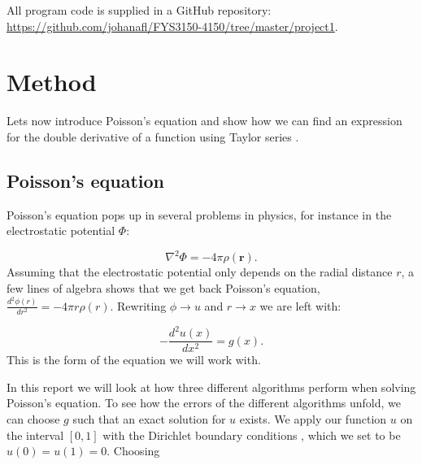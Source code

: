 \documentclass{emulateapj}
\begin{document}
    All program code is supplied in a GitHub repository: \url{https://github.com/johanafl/FYS3150-4150/tree/master/project1}.

\section{Method}
    Lets now introduce Poisson's equation and show how we can find an expression for the double derivative of a function using Taylor series \cite[Chapter 11]{kalkulus}.
    \subsection{Poisson's equation}
        Poisson's equation \cite[Chapter 13]{matmet} pops up in several problems in physics, for instance in the electrostatic potential \(\Phi\):
        
        \begin{equation*}
            \nabla^2\Phi = -4\pi\rho(\mathbf{r}).
        \end{equation*}
        Assuming that the electrostatic potential only depends on the radial distance \(r\), a few lines of algebra shows that we get back Poisson's equation, \(\frac{d^{2}\phi(r)}{dr^{2}}=-4\pi r\rho(r)\). Rewriting \(\phi\rightarrow u\) and \(r\rightarrow x\) we are left with:
        
        \begin{equation}\label{eq:Poisson_equation}
            -\frac{d^{2}u(x)}{dx^{2}} = g(x).
        \end{equation}
        This is the form of the equation we will work with.
        
        In this report we will look at how three different algorithms perform when solving Poisson's equation. To see how the errors of the different algorithms unfold, we can choose \(g\) such that an exact solution for \(u\) exists. We apply our function \( u \) on the interval \([0,1]\) with the Dirichlet boundary conditions \cite[Chapter 13]{matmet}, which we set to be \(u(0) = u(1) = 0\). Choosing
        
\end{document}
